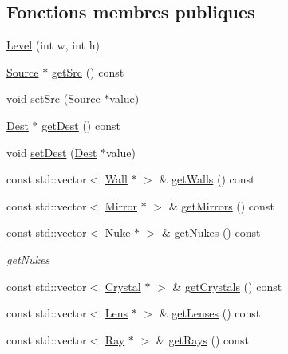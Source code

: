 \subsection*{Fonctions membres publiques}
\begin{DoxyCompactItemize}
\item 
\mbox{\hyperlink{class_level_a0350f00c8b282de634af2c09ec040bb8}{Level}} (int w, int h)
\item 
\mbox{\hyperlink{class_source}{Source}} $\ast$ \mbox{\hyperlink{class_level_a9398c949ef35d0e2b4cc159d39c1f61b}{get\+Src}} () const
\item 
void \mbox{\hyperlink{class_level_a772e71dd8937989d2f0718f1338e031f}{set\+Src}} (\mbox{\hyperlink{class_source}{Source}} $\ast$value)
\item 
\mbox{\hyperlink{class_dest}{Dest}} $\ast$ \mbox{\hyperlink{class_level_ab8a1974d8fe1c381dddb9cdfdf8bd929}{get\+Dest}} () const
\item 
void \mbox{\hyperlink{class_level_a49042f37e8ab0d6a8db43419783136fe}{set\+Dest}} (\mbox{\hyperlink{class_dest}{Dest}} $\ast$value)
\item 
const std\+::vector$<$ \mbox{\hyperlink{class_wall}{Wall}} $\ast$ $>$ \& \mbox{\hyperlink{class_level_ad82a42f6a8d77da65dc012f5f8064d48}{get\+Walls}} () const
\item 
const std\+::vector$<$ \mbox{\hyperlink{class_mirror}{Mirror}} $\ast$ $>$ \& \mbox{\hyperlink{class_level_a125da7c8f85b5fc14172dbe924dc2255}{get\+Mirrors}} () const
\item 
const std\+::vector$<$ \mbox{\hyperlink{class_nuke}{Nuke}} $\ast$ $>$ \& \mbox{\hyperlink{class_level_af3d73dcf1b986955c2244da45590462d}{get\+Nukes}} () const
\begin{DoxyCompactList}\small\item\em get\+Nukes \end{DoxyCompactList}\item 
const std\+::vector$<$ \mbox{\hyperlink{class_crystal}{Crystal}} $\ast$ $>$ \& \mbox{\hyperlink{class_level_afe7e7f6532c2b524e87f35bb592ec0d5}{get\+Crystals}} () const
\item 
const std\+::vector$<$ \mbox{\hyperlink{class_lens}{Lens}} $\ast$ $>$ \& \mbox{\hyperlink{class_level_a38b9b969eb86aaea2824666960f797b7}{get\+Lenses}} () const
\item 
const std\+::vector$<$ \mbox{\hyperlink{class_ray}{Ray}} $\ast$ $>$ \& \mbox{\hyperlink{class_level_a2e57737ceb0ed249c802cc6c47750b2e}{get\+Rays}} () const
\item 

\end{DoxyCompactItemize}
